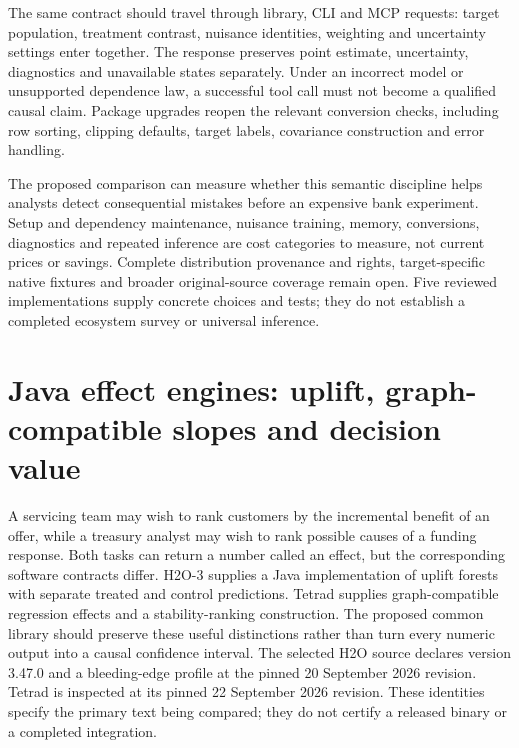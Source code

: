 The same contract should travel through library, CLI and MCP requests:
target population, treatment contrast, nuisance identities, weighting and
uncertainty settings enter together. The response preserves point estimate,
uncertainty, diagnostics and unavailable states separately. Under an
incorrect model or unsupported dependence law, a successful tool call
must not become a qualified causal claim. Package upgrades reopen the
relevant conversion checks, including row sorting, clipping defaults,
target labels, covariance construction and error handling.

The proposed comparison can measure whether this semantic discipline helps
analysts detect consequential mistakes before an expensive bank experiment.
Setup and dependency maintenance, nuisance training, memory, conversions,
diagnostics and repeated inference are cost categories to measure, not
current prices or savings. Complete distribution provenance and rights,
target-specific native fixtures and broader original-source coverage remain
open. Five reviewed implementations supply concrete choices and tests;
they do not establish a completed ecosystem survey or universal inference.


\section{Java effect engines: uplift, graph-compatible slopes and decision value}
\label{exec20:javafx-scope}

A servicing team may wish to rank customers by the incremental benefit of an
offer, while a treasury analyst may wish to rank possible causes of a funding
response. Both tasks can return a number called an effect, but the corresponding
software contracts differ. H2O-3 supplies a Java implementation of uplift
forests with separate treated and control predictions. Tetrad supplies
graph-compatible regression effects and a stability-ranking construction.
The proposed common library should preserve these useful distinctions rather
than turn every numeric output into a causal confidence interval. The selected
H2O source declares version 3.47.0 and a bleeding-edge profile at the pinned
20 September 2026 revision. Tetrad is inspected at its pinned 22 September 2026
revision. These identities specify the primary text being compared; they do
not certify a released binary or a completed integration.
\citep{exec20_javaeffects_h2o,exec20_javaeffects_tetrad}

